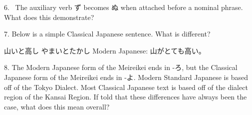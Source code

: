\par{6.  The auxiliary verb ず becomes ぬ when attached before a nominal phrase. What does this demonstrate? }

\par{7. Below is a simple Classical Japanese sentence. What is different? }

\par{山いと高し \hfill\break
やまいとたかし \hfill\break
Modern Japanese: 山がとても高い。 }

\par{8. The Modern Japanese form of the Meireikei ends in -ろ, but the Classical Japanese form of the Meireikei ends in -よ. Modern Standard Japanese is based off of the Tokyo Dialect. Most Classical Japanese text is based off of the dialect region of the Kansai Region. If told that these differences have always been the case, what does this mean overall? }
    